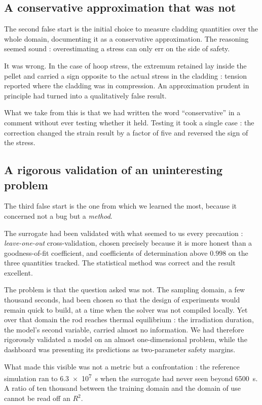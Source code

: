 \subsection{A conservative approximation that was not}

The second false start is the initial choice to measure cladding quantities over
the whole domain, documenting it as a conservative approximation. The reasoning
seemed sound : overestimating a stress can only err on the side of safety.

It was wrong. In the case of hoop stress, the extremum retained lay inside the
pellet and carried a sign opposite to the actual stress in the cladding : tension reported where the cladding was in compression. An approximation
prudent in principle had turned into a qualitatively false result.

What we take from this is that we had written the word ``conservative'' in a
comment without ever testing whether it held. Testing it took a single case : the
correction changed the strain result by a factor of five and reversed the sign
of the stress.

\subsection{A rigorous validation of an uninteresting problem}

The third false start is the one from which we learned the most, because it
concerned not a bug but a \emph{method}.

The surrogate had been validated with what seemed to us every precaution :
\textit{leave-one-out} cross-validation, chosen precisely because it is more
honest than a goodness-of-fit coefficient, and coefficients of determination
above $0.998$ on the three quantities tracked. The statistical method was
correct and the result excellent.

The problem is that the question asked was not. The sampling domain, a few
thousand seconds, had been chosen so that the design of experiments would
remain quick to build, at a time when the solver was not compiled locally. Yet
over that domain the rod reaches thermal equilibrium : the irradiation duration,
the model's second variable, carried almost no information. We had therefore
rigorously validated a model on an almost one-dimensional problem, while the
dashboard was presenting its predictions as two-parameter safety margins.

What made this visible was not a metric but a confrontation : the reference
simulation ran to \SI{6.3e7}{\second} when the surrogate had never seen beyond
\SI{6500}{\second}. A ratio of ten thousand between the training domain and the
domain of use cannot be read off an $R^2$.

